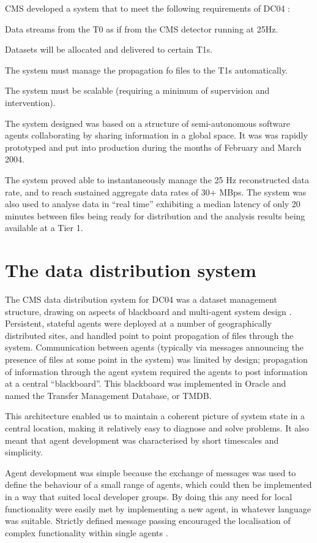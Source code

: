 \documentclass{cmspaper}
\begin{document}
CMS developed a system that to meet the following requirements of
DC04 \cite{dc04plan}:
\begin{list}{}{}
\item Data streams from the T0 as if from the CMS detector running at 25Hz.
\item Datasets will be allocated and delivered to certain T1s.
\item The system must manage the propagation fo files to the T1s automatically.
\item The system must be scalable (requiring a minimum of supervision and intervention).
\end{list}

The system designed was based on a structure of semi-autonomous
software agents collaborating by sharing information in a global
space. It was was rapidly prototyped and put into production during
the months of February and March 2004.

The system proved able to instantaneously manage the 25 Hz
reconstructed data rate, and to reach sustained aggregate data rates
of 30+ MBps. The system was also used to analyse data in ``real time''
exhibiting a median latency of only 20 minutes between files being
ready for distribution and the analysis results being available at a
Tier 1.

\section{The data distribution system}
The CMS data distribution system for DC04 was a dataset management
structure, drawing on aspects of blackboard and multi-agent system
design \cite{FG96,C03,Setal03}. Persistent, stateful agents were
deployed at a number of geographically distributed sites, and handled
point to point propagation of files through the system. Communication
between agents (typically via messages announcing the presence of
files at some point in the system) was limited by design; propagation
of information through the agent system required the agents to post
information at a central ``blackboard''. This blackboard was
implemented in Oracle and named the Transfer Management Database, or
TMDB.

This architecture enabled us to maintain a coherent picture of system
state in a central location, making it relatively easy to diagnose and
solve problems. It also meant that agent development was characterised
by short timescales and simplicity.

Agent development was simple because the exchange of messages was used
to define the behaviour of a small range of agents, which could then
be implemented in a way that suited local developer groups. By doing
this any need for local functionality were easily met by implementing
a new agent, in whatever language was suitable. Strictly defined
message passing encouraged the localisation of complex functionality
within single agents \cite{B03}.
\end{document}
